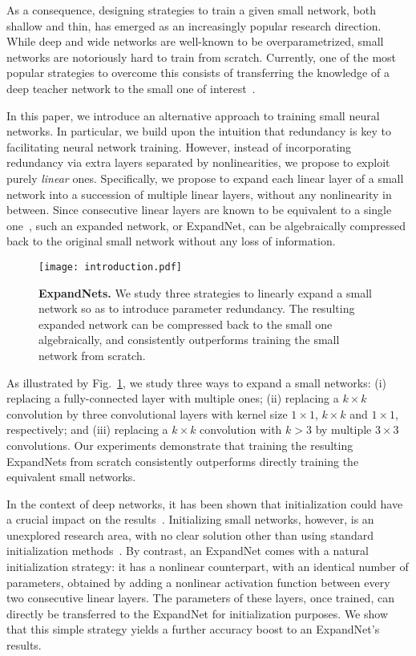 \documentclass[10pt,twocolumn,letterpaper]{article}
\begin{document}
As a consequence, designing strategies to train a given small network, both shallow and thin, has emerged as an increasingly popular research direction. While deep and wide networks are well-known to be overparametrized, small networks are notoriously hard to train from scratch. Currently, one of the most popular strategies to overcome this consists of transferring the knowledge of a deep teacher network to the small one of interest~\cite{hinton2015distilling,romero2014fitnets,8100237,Zagoruyko2017AT,pkt_eccv}. 

In this paper, we introduce an alternative approach to training small neural networks. In particular, we build upon the intuition that redundancy is key to facilitating neural network training. However, instead of incorporating redundancy via extra layers separated by nonlinearities, we propose to exploit purely \emph{linear} ones. Specifically, we propose to expand each linear layer of a small network into a succession of multiple linear layers, without any nonlinearity in between. Since consecutive linear layers are known to be equivalent to a single one~\cite{saxe2014}, such an expanded network, or ExpandNet, can be algebraically compressed back to the original small network without any loss of information.

\begin{figure}[t]
	\centering
	\texttt{[image: introduction.pdf]}
	\caption{{\bf ExpandNets.} We study three strategies to linearly expand a small network so as to introduce parameter redundancy. The resulting expanded network can be compressed back to the small one algebraically, and consistently outperforms training the small network from scratch.}
	\label{fig:framework}
\end{figure}

As illustrated by Fig.~\ref{fig:framework}, we study three ways to expand a small networks: (i) replacing a fully-connected layer with multiple ones; (ii) replacing a $k\times k$ convolution by three convolutional layers with kernel size $1\times 1$, $k \times k$ and $1\times 1$, respectively; and (iii) replacing a $k\times k$ convolution with $k>3$ by multiple $3\times 3$ convolutions. Our experiments demonstrate that training the resulting ExpandNets from scratch consistently outperforms directly training the equivalent small networks. 

In the context of deep networks, it has been shown that initialization could have a crucial impact on the results~\cite{Mishkin2015AllYN, He:2015}. Initializing small networks, however, is an unexplored research area, with no clear solution other than using standard initialization methods~\cite{XavierInit,He:2015}. 
By contrast, an ExpandNet comes with a natural initialization strategy: it has a nonlinear counterpart, with an identical number of parameters, obtained by adding a nonlinear activation function between every two consecutive linear layers. The parameters of these layers, once trained, can directly be transferred to the ExpandNet for initialization purposes. We show that this simple strategy yields a further accuracy boost to an ExpandNet's results. 
\end{document}
